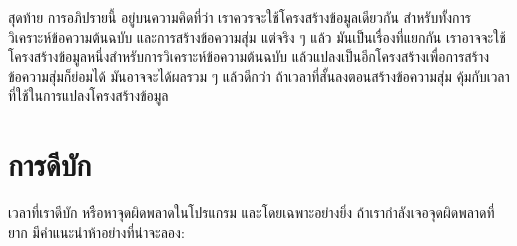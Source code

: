 
สุดท้าย การอภิปรายนี้ อยู่บนความคิดที่ว่า เราควรจะใช้โครงสร้างข้อมูลเดียวกัน สำหรับทั้งการวิเคราะห์ข้อความต้นฉบับ และการสร้างข้อความสุ่ม
แต่จริง ๆ แล้ว มันเป็นเรื่องที่แยกกัน
เราอาจจะใช้โครงสร้างข้อมูลหนึ่งสำหรับการวิเคราะห์ข้อความต้นฉบับ
แล้วแปลงเป็นอีกโครงสร้างเพื่อการสร้างข้อความสุ่มก็ย่อมได้
มันอาจจะได้ผลรวม ๆ แล้วดีกว่า ถ้าเวลาที่สั้นลงตอนสร้างข้อความสุ่ม คุ้มกับเวลาที่ใช้ในการแปลงโครงสร้างข้อมูล


\section{การดีบัก}


เวลาที่เราดีบัก หรือหาจุดผิดพลาดในโปรแกรม
และโดยเฉพาะอย่างยิ่ง ถ้าเรากำลังเจอจุดผิดพลาดที่ยาก
มีคำแนะนำห้าอย่างที่น่าจะลอง:

